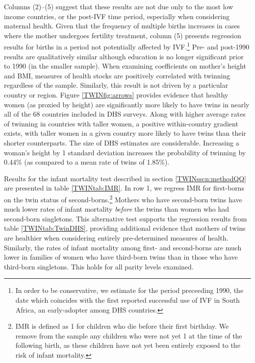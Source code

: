 \documentclass[subeqn]{article}
\begin{document}
\begin{spacing}{1.4}
Columns (2)--(5) suggest that these results are not due only to the most low 
income countries, or the post-IVF time period, especially when considering 
maternal health.  Given that the frequency of multiple births increases in 
cases where the mother undergoes fertility treatment, column (5) presents 
regression results for births in a period not potentially affected by 
IVF.\footnote{In order to be conservative, we estimate for the period 
preceeding 1990, the date which coincides with the first reported successful 
use of IVF in South Africa, an early-adopter among DHS countries.}  Pre- and 
post-1990 results are qualitatively similar although education is no longer 
significant prior to 1990 (in the smaller sample). When examining coefficients
on mother's height and BMI, measures of health stocks are positively correlated 
with twinning regardless of the sample.  Similarly, this result is not driven 
by a particular country or region.  Figure \ref{TWINfig:arrows} provides 
evidence that healthy women (as proxied by height) are significantly more 
likely to have twins in nearly all of the 68 countries included in DHS surveys.  
Along with higher average rates of twinning in countries with taller women, a 
positive within-country gradient exists, with taller women in a given country 
more likely to have twins than their shorter counterparts. The size of DHS 
estimates are considerable. Increasing a woman's height by 1 standard deviation 
increases the probability of twinning by 0.44\% (as compared to a mean rate of 
twins of 1.85\%).

Results for the infant mortality test described in section \ref{TWINsscn:methodQQ} 
are presented in table \ref{TWINtab:IMR}. In row 1, we regress IMR for first-borns
on the twin status of second-borns.\footnote{IMR is defined as 1 for children
who die before their first birthday.  We remove from the sample any children who
were not yet 1 at the time of the following birth, as these children have not
yet been entirely exposed to the risk of infant mortality.}  Mothers who have 
second-born twins have much lower rates of infant mortality \emph{before} the 
twins than women who had second-born singletons.  This alternative test supports
the regression results from table \ref{TWINtab:TwinDHS}, providing additional 
evidence that mothers of twins are healthier when considering entirely 
pre-determined measures of health. Similarly, the rates of infant mortality among 
first- and second-borns are much lower in families of women who have third-born 
twins than in those who have third-born singletons.  This holds for all parity 
levels examined.


\end{spacing}
\end{document}
